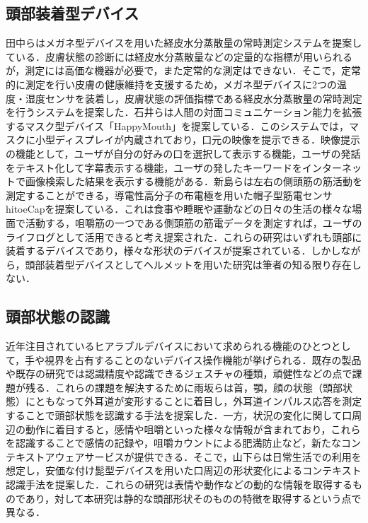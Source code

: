 \documentclass[Japanese,noauthor]{dicomopapers}
\begin{document}
\subsection{頭部装着型デバイス}
田中ら\cite{glasses}はメガネ型デバイスを用いた経皮水分蒸散量の常時測定システムを提案している．皮膚状態の診断には経皮水分蒸散量などの定量的な指標が用いられるが，測定には高価な機器が必要で，また定常的な測定はできない．そこで，定常的に測定を行い皮膚の健康維持を支援するため，メガネ型デバイスに2つの温度・湿度センサを装着し，皮膚状態の評価指標である経皮水分蒸散量の常時測定を行うシステムを提案した．石井ら\cite{happymouth}は人間の対面コミュニケーション能力を拡張するマスク型デバイス「HappyMouth」を提案している．このシステムでは，マスクに小型ディスプレイが内蔵されており，口元の映像を提示できる．映像提示の機能として，ユーザが自分の好みの口を選択して表示する機能，ユーザの発話をテキスト化して字幕表示する機能，ユーザの発したキーワードをインターネットで画像検索した結果を表示する機能がある．新島ら\cite{cap_sensor}は左右の側頭筋の筋活動を測定することができる，導電性高分子の布電極を用いた帽子型筋電センサhitoeCapを提案している．これは食事や睡眠や運動などの日々の生活の様々な場面で活動する，咀嚼筋の一つである側頭筋の筋電データを測定すれば，ユーザのライフログとして活用できると考え提案された．これらの研究はいずれも頭部に装着するデバイスであり，様々な形状のデバイスが提案されている．しかしながら，頭部装着型デバイスとしてヘルメットを用いた研究は筆者の知る限り存在しない．

\subsection{頭部状態の認識}
近年注目されているヒアラブルデバイスにおいて求められる機能のひとつとして，手や視界を占有することのないデバイス操作機能が挙げられる．既存の製品や既存の研究では認識精度や認識できるジェスチャの種類，頑健性などの点で課題が残る．これらの課題を解決するために雨坂ら\cite{ear}は首，顎，顔の状態（頭部状態）にともなって外耳道が変形することに着目し，外耳道インパルス応答を測定することで頭部状態を認識する手法を提案した．一方，状況の変化に関して口周辺の動作に着目すると，感情や咀嚼といった様々な情報が含まれており，これらを認識することで感情の記録や，咀嚼カウントによる肥満防止など，新たなコンテキストアウェアサービスが提供できる．そこで，山下ら\cite{mouth}は日常生活での利用を想定し，安価な付け髭型デバイスを用いた口周辺の形状変化によるコンテキスト認識手法を提案した．これらの研究は表情や動作などの動的な情報を取得するものであり，対して本研究は静的な頭部形状そのものの特徴を取得するという点で異なる．
\end{document}
